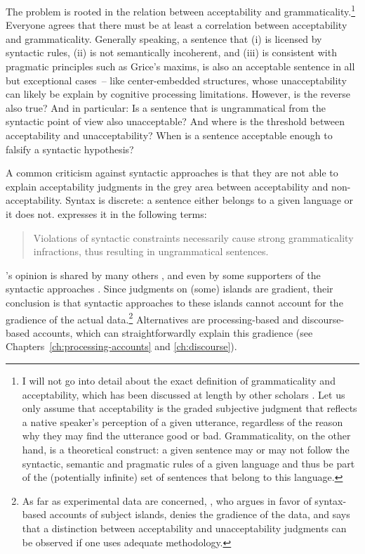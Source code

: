 The problem is rooted in the relation between acceptability and grammaticality.\footnote{I will not go into detail about the exact definition of grammaticality and acceptability, which has been discussed at length by other scholars \citep[a.o.][]{Schutze.2016.ex1996}. Let us only assume that acceptability is the graded subjective judgment that reflects a native speaker's perception of a given utterance, regardless of the reason why they may find the utterance good or bad. 
Grammaticality, on the other hand, is a theoretical construct: a given sentence may or may not follow the syntactic, semantic and pragmatic rules of a given language and thus be part of the (potentially infinite) set of sentences that belong to this language.}
Everyone agrees that there must be at least a correlation between acceptability and grammaticality. Generally speaking, a sentence that (i) is licensed by syntactic rules, (ii) is not semantically incoherent, and (iii) is consistent with pragmatic principles such as Grice's maxims, is also an acceptable sentence in all but exceptional cases~-- like center-embedded structures, whose unacceptability can likely be explain by cognitive processing limitations. However, is the reverse also true? And in particular: Is a sentence that is ungrammatical from the syntactic point of view also unacceptable? And where is the threshold between acceptability and unacceptability? When is a sentence acceptable enough to falsify a syntactic hypothesis?

A common criticism against syntactic approaches is that they are not able to explain acceptability judgments in the grey area between acceptability and non-acceptability. Syntax is discrete: a sentence either belongs to a given language or it does not. \citeauthor{Erteschik-Shir.2006} expresses it in the following terms:

\begin{quote}
    Violations of syntactic constraints necessarily
cause strong grammaticality infractions, thus resulting in ungrammatical
sentences.\\
\hbox{}\hfill\hbox{\citep[335]{Erteschik-Shir.2006}}
\end{quote}

\citeauthor{Erteschik-Shir.2006}'s opinion is shared by many others \citep[e.g.][]{Chaves.2013,Hofmeister.2010,Abeille.2020.Cognition}, and even by some supporters of the syntactic approaches \citep{Sprouse.2007.Acceptability}. Since judgments on (some) islands are gradient, their conclusion is that syntactic approaches to these islands cannot account for the gradience of the actual data.\footnote{As far as experimental data are concerned, \citet{Sprouse.2007.Acceptability}, who argues in favor of syntax-based accounts of subject islands, denies the gradience of the data, and says that a distinction between acceptability and unacceptability judgments can be observed if one uses adequate methodology.}
Alternatives are processing-based and discourse-based accounts, which can straightforwardly explain this gradience (see Chapters~\ref{ch:processing-accounts} and \ref{ch:discourse}). 

